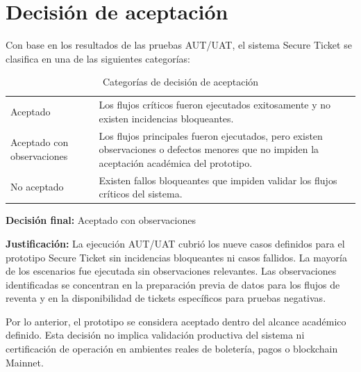 \documentclass[12pt,letterpaper]{article}
\newcommand{\NombreProyecto}{Secure Ticket}
\begin{document}
\section{Decisión de aceptación}

Con base en los resultados de las pruebas AUT/UAT, el sistema \NombreProyecto{} se clasifica en una de las siguientes categorías:

\begin{table}[H]
\centering
\begingroup
\footnotesize
\setlength{\tabcolsep}{3pt}
\renewcommand{\arraystretch}{1.25}

\begin{tabularx}{\textwidth}{|
>{\raggedright\arraybackslash}p{4.0cm}|
>{\raggedright\arraybackslash}X|}
\hline
\multicolumn{1}{|>{\centering\arraybackslash}m{4.0cm}|}{\textbf{Decisión}} &
\multicolumn{1}{>{\centering\arraybackslash}m{10.2cm}|}{\textbf{Descripción}} \\
\hline
Aceptado & Los flujos críticos fueron ejecutados exitosamente y no existen incidencias bloqueantes. \\
\hline
Aceptado con observaciones & Los flujos principales fueron ejecutados, pero existen observaciones o defectos menores que no impiden la aceptación académica del prototipo. \\
\hline
No aceptado & Existen fallos bloqueantes que impiden validar los flujos críticos del sistema. \\
\hline
\end{tabularx}

\endgroup
\caption{Categorías de decisión de aceptación}
\label{tab:categorias-decision-aceptacion}
\end{table}

\textbf{Decisión final: }Aceptado con observaciones

\textbf{Justificación: }La ejecución AUT/UAT cubrió los nueve casos definidos para el prototipo \NombreProyecto{} sin incidencias bloqueantes ni casos fallidos. La mayoría de los escenarios fue ejecutada sin observaciones relevantes. Las observaciones identificadas se concentran en la preparación previa de datos para los flujos de reventa y en la disponibilidad de tickets específicos para pruebas negativas.

Por lo anterior, el prototipo se considera aceptado dentro del alcance académico definido. Esta decisión no implica validación productiva del sistema ni certificación de operación en ambientes reales de boletería, pagos o blockchain Mainnet.
\end{document}
